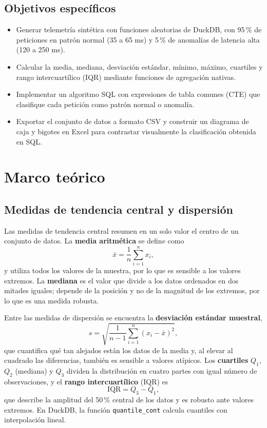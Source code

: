 \documentclass[12pt,letterpaper]{article}
\begin{document}
\subsection{Objetivos específicos}
\begin{itemize}
    \item Generar telemetría sintética con funciones aleatorias de DuckDB, con 95\,\% de peticiones en patrón normal (35 a 65 ms) y 5\,\% de anomalías de latencia alta (120 a 250 ms).
    \item Calcular la media, mediana, desviación estándar, mínimo, máximo, cuartiles y rango intercuartílico (IQR) mediante funciones de agregación nativas.
    \item Implementar un algoritmo SQL con expresiones de tabla comunes (CTE) que clasifique cada petición como patrón normal o anomalía.
    \item Exportar el conjunto de datos a formato CSV y construir un diagrama de caja y bigotes en Excel para contrastar visualmente la clasificación obtenida en SQL.
\end{itemize}
 
\section{Marco teórico}
 
\subsection{Medidas de tendencia central y dispersión}
Las medidas de tendencia central resumen en un solo valor el centro de un conjunto de datos. La \textbf{media aritmética} se define como
\begin{equation}
    \bar{x} = \frac{1}{n}\sum_{i=1}^{n} x_i ,
\end{equation}
y utiliza todos los valores de la muestra, por lo que es sensible a los valores extremos. La \textbf{mediana} es el valor que divide a los datos ordenados en dos mitades iguales; depende de la posición y no de la magnitud de los extremos, por lo que es una medida robusta. \cite{tukey-1977}
 
Entre las medidas de dispersión se encuentra la \textbf{desviación estándar muestral},
\begin{equation}
    s = \sqrt{\frac{1}{n-1}\sum_{i=1}^{n}(x_i-\bar{x})^2},
\end{equation}
que cuantifica qué tan alejados están los datos de la media y, al elevar al cuadrado las diferencias, también es sensible a valores atípicos. Los \textbf{cuartiles} $Q_1$, $Q_2$ (mediana) y $Q_3$ dividen la distribución en cuatro partes con igual número de observaciones, y el \textbf{rango intercuartílico} (IQR) es
\begin{equation}
    \mathrm{IQR} = Q_3 - Q_1,
\end{equation}
que describe la amplitud del 50\,\% central de los datos y es robusto ante valores extremos. En DuckDB, la función \texttt{quantile\_cont} calcula cuantiles con interpolación lineal. \cite{duckdb-docs}
 
\end{document}
